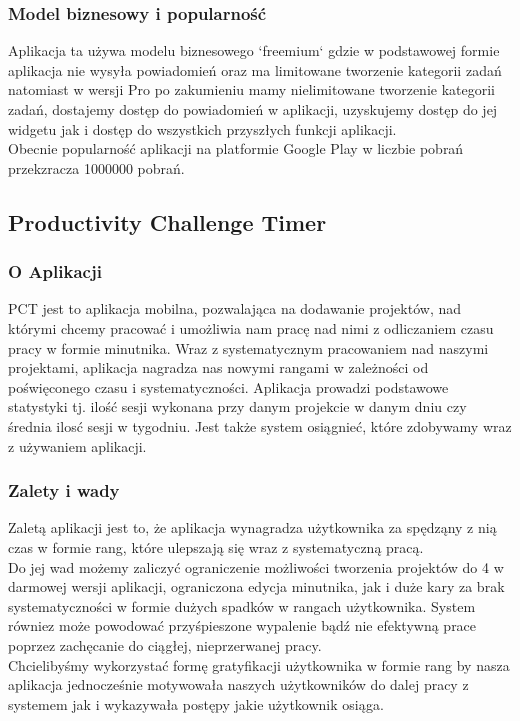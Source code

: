 \documentclass[a4paper,11pt]{report}
\begin{document}
\subsubsection{Model biznesowy i popularność}
Aplikacja ta używa modelu biznesowego `freemium` gdzie w podstawowej formie aplikacja nie wysyła powiadomień oraz ma limitowane tworzenie kategorii zadań natomiast w wersji Pro po zakumieniu mamy nielimitowane tworzenie kategorii zadań, dostajemy dostęp do powiadomień w aplikacji, uzyskujemy dostęp do jej widgetu jak i dostęp do wszystkich przyszłych funkcji aplikacji.
\vspace{0,5cm}\\Obecnie popularność aplikacji na platformie Google Play w liczbie pobrań przekzracza 1000000 pobrań.
\subsection{Productivity Challenge Timer}
\subsubsection{O Aplikacji}
PCT jest to aplikacja mobilna, pozwalająca na dodawanie projektów, nad którymi chcemy pracować i umożliwia nam pracę nad nimi z odliczaniem czasu pracy w formie minutnika. Wraz z systematycznym pracowaniem nad naszymi projektami, aplikacja nagradza nas nowymi rangami w zależności od poświęconego czasu i systematyczności. Aplikacja prowadzi podstawowe statystyki tj. ilość sesji wykonana przy danym projekcie w danym dniu czy średnia ilosć sesji w tygodniu. Jest także system osiągnieć, które zdobywamy wraz z używaniem aplikacji.
\subsubsection{Zalety i wady}
Zaletą aplikacji jest to, że aplikacja wynagradza użytkownika za spędząny z nią czas w formie rang, które ulepszają się wraz z systematyczną pracą. \vspace{0,5cm}\\Do jej wad możemy zaliczyć ograniczenie możliwości tworzenia projektów do 4 w darmowej wersji aplikacji, ograniczona edycja minutnika, jak i duże kary za brak systematyczności w formie dużych spadków w rangach użytkownika. System równiez może powodować przyśpieszone wypalenie bądź nie efektywną prace poprzez zachęcanie do ciągłej, nieprzerwanej pracy.
\vspace{0,5cm}\\Chcielibyśmy wykorzystać formę gratyfikacji użytkownika w formie rang by nasza aplikacja jednocześnie motywowała naszych użytkowników do dalej pracy z systemem jak i wykazywała postępy jakie użytkownik osiąga.
\end{document}
